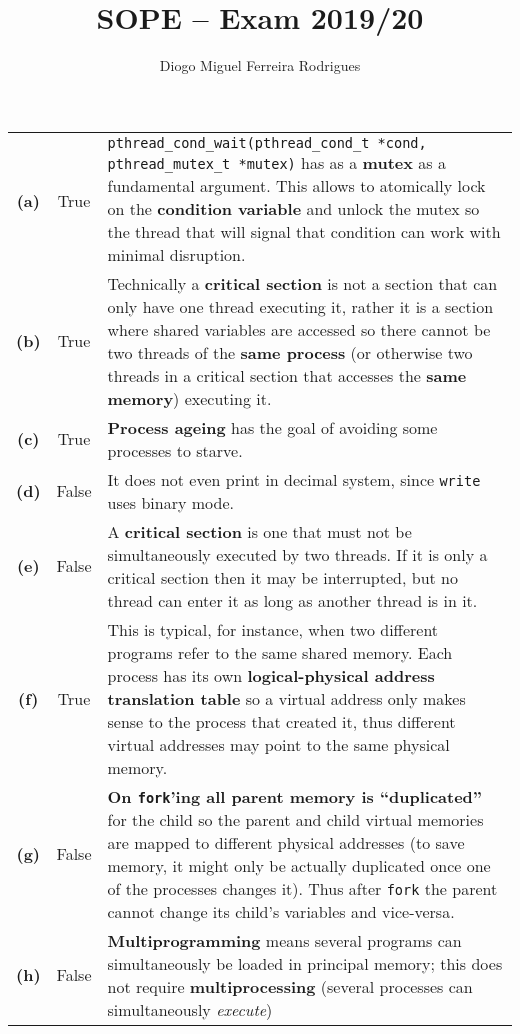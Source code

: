 \documentclass{sope}
\title{SOPE -- Exam 2019/20}
\author{Diogo Miguel Ferreira Rodrigues \\ \email{dmfrodrigues2000@gmail.com}}
\begin{document}
\setcounter{chapter}{19}
\begin{center}    
    \begin{longtable}{c | c p{132mm}}
        \textbf{(a)} & True & \texttt{pthread\_cond\_wait(pthread\_cond\_t *cond, pthread\_mutex\_t *mutex)} has as a \textbf{mutex} as a fundamental argument. This allows to atomically lock on the \textbf{condition variable} and unlock the mutex so the thread that will signal that condition can work with minimal disruption. \\
        \textbf{(b)} & True & Technically a \textbf{critical section} is not a section that can only have one thread executing it, rather it is a section where shared variables are accessed so there cannot be two threads of the \textbf{same process} (or otherwise two threads in a critical section that accesses the \textbf{same memory}) executing it. \\
        \textbf{(c)} & True & \textbf{Process ageing} has the goal of avoiding some processes to starve. \\
        \textbf{(d)} & False & It does not even print in decimal system, since \texttt{write} uses binary mode. \\
        \textbf{(e)} & False & A \textbf{critical section} is one that must not be simultaneously executed by two threads. If it is only a critical section then it may be interrupted, but no thread can enter it as long as another thread is in it. \\
        \textbf{(f)} & True & This is typical, for instance, when two different programs refer to the same shared memory. Each process has its own \textbf{logical-physical address translation table} so a virtual address only makes sense to the process that created it, thus different virtual addresses may point to the same physical memory. \\
        \textbf{(g)} & False & \textbf{On \texttt{fork}'ing all parent memory is ``duplicated''} for the child so the parent and child virtual memories are mapped to different physical addresses (to save memory, it might only be actually duplicated once one of the processes changes it). Thus after \texttt{fork} the parent cannot change its child's variables and vice-versa. \\
        \textbf{(h)} & False & \textbf{Multiprogramming} means several programs can simultaneously be loaded in principal memory; this does not require \textbf{multiprocessing} (several processes can simultaneously \textit{execute})\\

\end{longtable}
\end{center}
\end{document}
